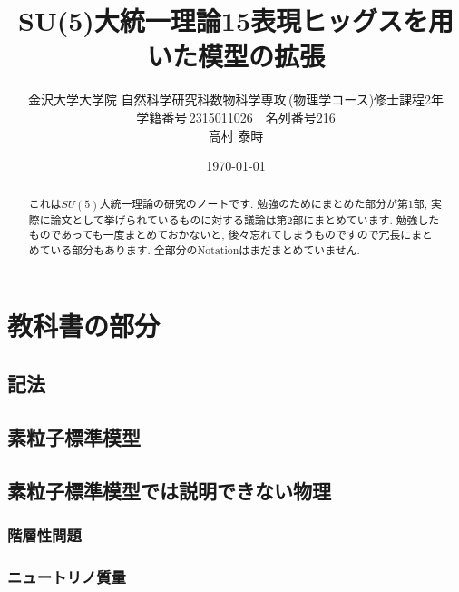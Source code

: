 \documentclass[uplatex,dvipdfmx,a4paper,titlepage]{jsbook}
\theoremstyle{plain}
\theoremstyle{definition}
\begin{document}
\title{SU(5)大統一理論15表現ヒッグスを用いた模型の拡張}
\author{金沢大学大学院\,\,自然科学研究科数物科学専攻\,(物理学コース)修士課程2年\\学籍番号\,2315011026$\quad$名列番号216\\高村 泰時} 
\date{\today}
\maketitle

\tableofcontents
\clearpage

\begin{abstract}
  これは$SU(5)$大統一理論の研究のノートです.
  勉強のためにまとめた部分が第1部, 実際に論文として挙げられているものに対する議論は第2部にまとめています.
  勉強したものであっても一度まとめておかないと, 後々忘れてしまうものですので冗長にまとめている部分もあります.
  全部分のNotationはまだまとめていません.
\end{abstract}

\part{教科書の部分}

\chapter{記法}


\chapter{素粒子標準模型}


\chapter{素粒子標準模型では説明できない物理}


\section{階層性問題}


\section{ニュートリノ質量}

\end{document}
